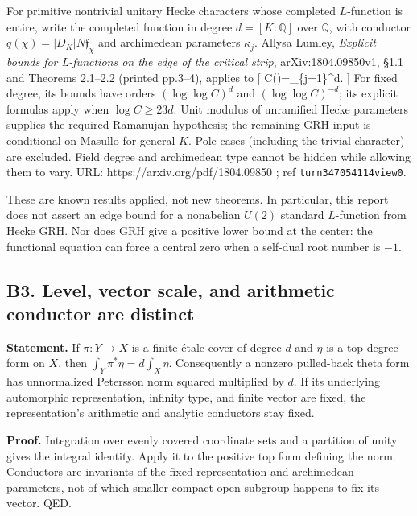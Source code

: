 \documentclass[11pt,a4paper]{article}
\theoremstyle{definition}
\begin{document}
For primitive nontrivial unitary Hecke characters whose completed
\(L\)-function is entire, write the completed function in degree
\(d=[K:\mathbb Q]\) over \(\mathbb Q\), with conductor
\(q(\chi)=|D_K|N\mathfrak f_\chi\) and archimedean parameters
\(\kappa_j\). Allysa Lumley, \emph{Explicit bounds for L-functions on
the edge of the critical strip}, arXiv:1804.09850v1, §1.1 and Theorems
2.1--2.2 (printed pp.3--4), applies to {[}
C(\chi)=\prod\_\{j=1\}\^{}d\left\textbar{}\right\textbar.
{]} For fixed degree, its bounds have orders \((\log\log C)^{d}\) and
\((\log\log C)^{-d}\); its explicit formulas apply when
\(\log C\geq23d\). Unit modulus of unramified Hecke parameters supplies
the required Ramanujan hypothesis; the remaining GRH input is
conditional on Masullo for general \(K\). Pole cases (including the
trivial character) are excluded. Field degree and archimedean type
cannot be hidden while allowing them to vary. URL:
https://arxiv.org/pdf/1804.09850 ; ref \texttt{turn347054114view0}.

These are known results applied, not new theorems. In particular, this
report does not assert an edge bound for a nonabelian \(U(2)\) standard
\(L\)-function from Hecke GRH. Nor does GRH give a positive lower bound
at the center: the functional equation can force a central zero when a
self-dual root number is \(-1\).

\subsection{B3. Level, vector scale, and arithmetic conductor are
distinct}\label{b3.-level-vector-scale-and-arithmetic-conductor-are-distinct}

\textbf{Statement.} If \(\pi:Y\to X\) is a finite étale cover of degree
\(d\) and \(\eta\) is a top-degree form on \(X\), then
\(\int_Y\pi^*\eta=d\int_X\eta\). Consequently a nonzero pulled-back
theta form has unnormalized Petersson norm squared multiplied by \(d\).
If its underlying automorphic representation, infinity type, and finite
vector are fixed, the representation's arithmetic and analytic
conductors stay fixed.

\textbf{Proof.} Integration over evenly covered coordinate sets and a
partition of unity gives the integral identity. Apply it to the positive
top form defining the norm. Conductors are invariants of the fixed
representation and archimedean parameters, not of which smaller compact
open subgroup happens to fix its vector. QED.
\end{document}
